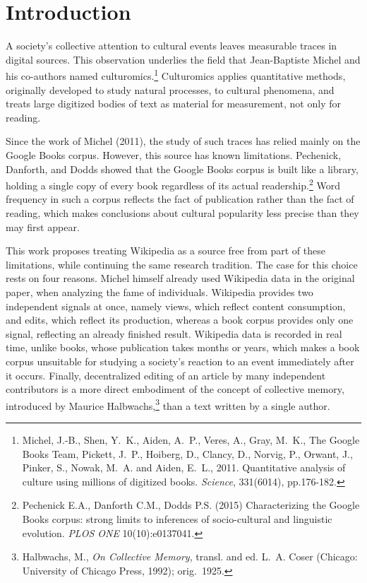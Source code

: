 \documentclass[11pt]{article}
\begin{document}
\section*{Introduction}

A society's collective attention to cultural events leaves measurable traces in digital sources. This observation underlies the field that Jean-Baptiste Michel and his co-authors named culturomics.\footnote{Michel, J.-B., Shen, Y.~K., Aiden, A.~P., Veres, A., Gray, M.~K., The Google Books Team, Pickett, J.~P., Hoiberg, D., Clancy, D., Norvig, P., Orwant, J., Pinker, S., Nowak, M.~A. and Aiden, E.~L., 2011. Quantitative analysis of culture using millions of digitized books. \textit{Science}, 331(6014), pp.176-182.} Culturomics applies quantitative methods, originally developed to study natural processes, to cultural phenomena, and treats large digitized bodies of text as material for measurement, not only for reading.

Since the work of Michel (2011), the study of such traces has relied mainly on the Google Books corpus. However, this source has known limitations. Pechenick, Danforth, and Dodds showed that the Google Books corpus is built like a library, holding a single copy of every book regardless of its actual readership.\footnote{Pechenick E.A., Danforth C.M., Dodds P.S. (2015) Characterizing the Google Books corpus: strong limits to inferences of socio-cultural and linguistic evolution. \textit{PLOS ONE} 10(10):e0137041.} Word frequency in such a corpus reflects the fact of publication rather than the fact of reading, which makes conclusions about cultural popularity less precise than they may first appear.

This work proposes treating Wikipedia as a source free from part of these limitations, while continuing the same research tradition. The case for this choice rests on four reasons. Michel himself already used Wikipedia data in the original paper, when analyzing the fame of individuals. Wikipedia provides two independent signals at once, namely views, which reflect content consumption, and edits, which reflect its production, whereas a book corpus provides only one signal, reflecting an already finished result. Wikipedia data is recorded in real time, unlike books, whose publication takes months or years, which makes a book corpus unsuitable for studying a society's reaction to an event immediately after it occurs. Finally, decentralized editing of an article by many independent contributors is a more direct embodiment of the concept of collective memory, introduced by Maurice Halbwachs,\footnote{Halbwachs, M., \textit{On Collective Memory}, transl. and ed. L.~A. Coser (Chicago: University of Chicago Press, 1992); orig.\ 1925.} than a text written by a single author.
\end{document}
